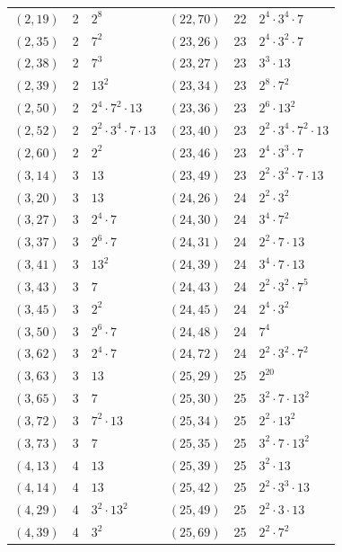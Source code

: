 \documentclass[11pt]{article}
\begin{document}
\begin{longtable}{@{}lrl@{\qquad}lrl@{}}
$(2,19)$ & 2 & $2^{8}$ & $(22,70)$ & 22 & $2^{4}\cdot 3^{4}\cdot 7$\\
$(2,35)$ & 2 & $7^{2}$ & $(23,26)$ & 23 & $2^{4}\cdot 3^{2}\cdot 7$\\
$(2,38)$ & 2 & $7^{3}$ & $(23,27)$ & 23 & $3^{3}\cdot 13$\\
$(2,39)$ & 2 & $13^{2}$ & $(23,34)$ & 23 & $2^{8}\cdot 7^{2}$\\
$(2,50)$ & 2 & $2^{4}\cdot 7^{2}\cdot 13$ & $(23,36)$ & 23 & $2^{6}\cdot 13^{2}$\\
$(2,52)$ & 2 & $2^{2}\cdot 3^{4}\cdot 7\cdot 13$ & $(23,40)$ & 23 & $2^{2}\cdot 3^{4}\cdot 7^{2}\cdot 13$\\
$(2,60)$ & 2 & $2^{2}$ & $(23,46)$ & 23 & $2^{4}\cdot 3^{3}\cdot 7$\\
$(3,14)$ & 3 & $13$ & $(23,49)$ & 23 & $2^{2}\cdot 3^{2}\cdot 7\cdot 13$\\
$(3,20)$ & 3 & $13$ & $(24,26)$ & 24 & $2^{2}\cdot 3^{2}$\\
$(3,27)$ & 3 & $2^{4}\cdot 7$ & $(24,30)$ & 24 & $3^{4}\cdot 7^{2}$\\
$(3,37)$ & 3 & $2^{6}\cdot 7$ & $(24,31)$ & 24 & $2^{2}\cdot 7\cdot 13$\\
$(3,41)$ & 3 & $13^{2}$ & $(24,39)$ & 24 & $3^{4}\cdot 7\cdot 13$\\
$(3,43)$ & 3 & $7$ & $(24,43)$ & 24 & $2^{2}\cdot 3^{2}\cdot 7^{5}$\\
$(3,45)$ & 3 & $2^{2}$ & $(24,45)$ & 24 & $2^{4}\cdot 3^{2}$\\
$(3,50)$ & 3 & $2^{6}\cdot 7$ & $(24,48)$ & 24 & $7^{4}$\\
$(3,62)$ & 3 & $2^{4}\cdot 7$ & $(24,72)$ & 24 & $2^{2}\cdot 3^{2}\cdot 7^{2}$\\
$(3,63)$ & 3 & $13$ & $(25,29)$ & 25 & $2^{20}$\\
$(3,65)$ & 3 & $7$ & $(25,30)$ & 25 & $3^{2}\cdot 7\cdot 13^{2}$\\
$(3,72)$ & 3 & $7^{2}\cdot 13$ & $(25,34)$ & 25 & $2^{2}\cdot 13^{2}$\\
$(3,73)$ & 3 & $7$ & $(25,35)$ & 25 & $3^{2}\cdot 7\cdot 13^{2}$\\
$(4,13)$ & 4 & $13$ & $(25,39)$ & 25 & $3^{2}\cdot 13$\\
$(4,14)$ & 4 & $13$ & $(25,42)$ & 25 & $2^{2}\cdot 3^{3}\cdot 13$\\
$(4,29)$ & 4 & $3^{2}\cdot 13^{2}$ & $(25,49)$ & 25 & $2^{2}\cdot 3\cdot 13$\\
$(4,39)$ & 4 & $3^{2}$ & $(25,69)$ & 25 & $2^{2}\cdot 7^{2}$\\

\end{longtable}
\end{document}
